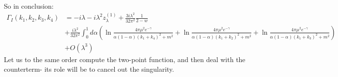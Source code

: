 So in conclusion:
\begin{equation}
    \begin{split}
        \Gamma_I(k_1, k_2, k_3, k_4) &= -i\lambda - i\lambda^2 z_\lambda^{(1)} + \frac{3i\lambda^2}{32\pi^2}\frac{1}{2-w} 
        \\ &+ \frac{i\lambda^2}{32\pi^2}\int_0^1 d\alpha \left(\ln\frac{4\pi \mu^2 e^{-\gamma}}{\alpha(1-\alpha)(k_1 + k_4)^2 + m^2} + \ln\frac{4\pi \mu^2 e^{-\gamma}}{\alpha(1-\alpha)(k_1 + k_2)^2 + m^2} + \ln\frac{4\pi \mu^2 e^{-\gamma}}{\alpha(1-\alpha)(k_1 + k_3)^2 + m^2}\right) 
        \\ &+ O(\lambda^3)
    \end{split}
\end{equation}
Let us to the same order compute the two-point function, and then deal with the counterterm- its role will be to cancel out the singularity.

